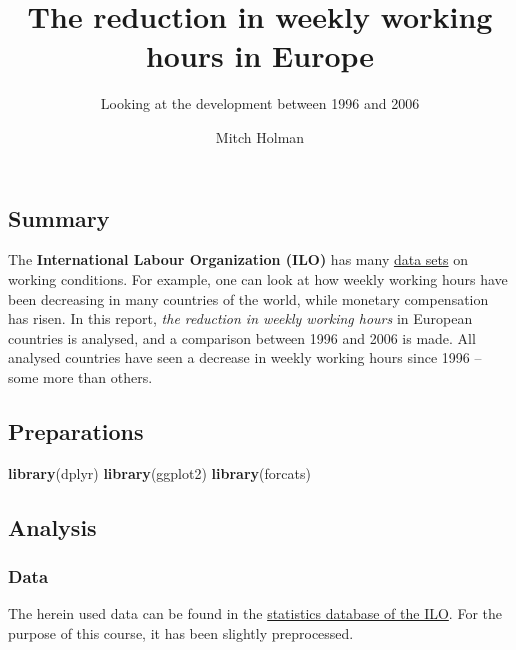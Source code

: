 \documentclass[]{article}
\title{The reduction in weekly working hours in Europe}
\subtitle{Looking at the development between 1996 and 2006}
\author{Mitch Holman}
\date{}
\newenvironment{Shaded}{\begin{snugshade}}{\end{snugshade}}
\newcommand{\KeywordTok}[1]{\textcolor[rgb]{0.13,0.29,0.53}{\textbf{#1}}}
\newcommand{\NormalTok}[1]{#1}
\begin{document}
\maketitle

\subsection{Summary}\label{summary}

The \textbf{International Labour Organization (ILO)} has many
\href{http://www.ilo.org/global/statistics-and-databases/lang--en/index.htm}{data
sets} on working conditions. For example, one can look at how weekly
working hours have been decreasing in many countries of the world, while
monetary compensation has risen. In this report, \emph{the reduction in
weekly working hours} in European countries is analysed, and a
comparison between 1996 and 2006 is made. All analysed countries have
seen a decrease in weekly working hours since 1996 -- some more than
others.

\subsection{Preparations}\label{preparations}

\begin{Shaded}
\begin{Highlighting}[]
\KeywordTok{library}\NormalTok{(dplyr)}
\KeywordTok{library}\NormalTok{(ggplot2)}
\KeywordTok{library}\NormalTok{(forcats)}
\end{Highlighting}
\end{Shaded}

\subsection{Analysis}\label{analysis}

\subsubsection{Data}\label{data}

The herein used data can be found in the
\href{http://www.ilo.org/ilostat/faces/wcnav_defaultSelection;ILOSTATCOOKIE=ZOm2Lqrr-OIuzxNGn2_08bNe9AmHQ1kUA6FydqyZJeIudFLb2Yz5!1845546174?_afrLoop=32158017365146\&_afrWindowMode=0\&_afrWindowId=null\#!\%40\%40\%3F_afrWindowId\%3Dnull\%26_afrLoop\%3D32158017365146\%26_afrWindowMode\%3D0\%26_adf.ctrl-state\%3D4cwaylvi8_4}{statistics
database of the ILO}. For the purpose of this course, it has been
slightly preprocessed.
\end{document}
